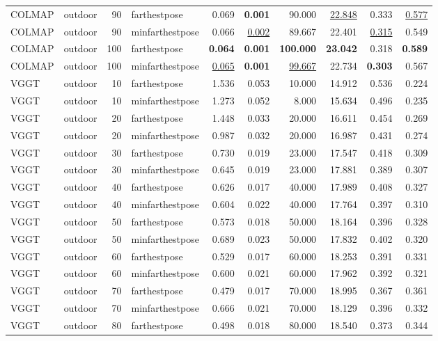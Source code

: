 \begin{table}[H]
\begin{tabular}{llrlrrrrrr}
COLMAP & outdoor & 90 & farthestpose & 0.069 & \textbf{0.001} & 90.000 & \underline{22.848} & 0.333 & \underline{0.577} \\
COLMAP & outdoor & 90 & minfarthestpose & 0.066 & \underline{0.002} & 89.667 & 22.401 & \underline{0.315} & 0.549 \\
COLMAP & outdoor & 100 & farthestpose & \textbf{0.064} & \textbf{0.001} & \textbf{100.000} & \textbf{23.042} & 0.318 & \textbf{0.589} \\
COLMAP & outdoor & 100 & minfarthestpose & \underline{0.065} & \textbf{0.001} & \underline{99.667} & 22.734 & \textbf{0.303} & 0.567 \\
VGGT & outdoor & 10 & farthestpose & 1.536 & 0.053 & 10.000 & 14.912 & 0.536 & 0.224 \\
VGGT & outdoor & 10 & minfarthestpose & 1.273 & 0.052 & 8.000 & 15.634 & 0.496 & 0.235 \\
VGGT & outdoor & 20 & farthestpose & 1.448 & 0.033 & 20.000 & 16.611 & 0.454 & 0.269 \\
VGGT & outdoor & 20 & minfarthestpose & 0.987 & 0.032 & 20.000 & 16.987 & 0.431 & 0.274 \\
VGGT & outdoor & 30 & farthestpose & 0.730 & 0.019 & 23.000 & 17.547 & 0.418 & 0.309 \\
VGGT & outdoor & 30 & minfarthestpose & 0.645 & 0.019 & 23.000 & 17.881 & 0.389 & 0.307 \\
VGGT & outdoor & 40 & farthestpose & 0.626 & 0.017 & 40.000 & 17.989 & 0.408 & 0.327 \\
VGGT & outdoor & 40 & minfarthestpose & 0.604 & 0.022 & 40.000 & 17.764 & 0.397 & 0.310 \\
VGGT & outdoor & 50 & farthestpose & 0.573 & 0.018 & 50.000 & 18.164 & 0.396 & 0.328 \\
VGGT & outdoor & 50 & minfarthestpose & 0.689 & 0.023 & 50.000 & 17.832 & 0.402 & 0.320 \\
VGGT & outdoor & 60 & farthestpose & 0.529 & 0.017 & 60.000 & 18.253 & 0.391 & 0.331 \\
VGGT & outdoor & 60 & minfarthestpose & 0.600 & 0.021 & 60.000 & 17.962 & 0.392 & 0.321 \\
VGGT & outdoor & 70 & farthestpose & 0.479 & 0.017 & 70.000 & 18.995 & 0.367 & 0.361 \\
VGGT & outdoor & 70 & minfarthestpose & 0.666 & 0.021 & 70.000 & 18.129 & 0.396 & 0.332 \\
VGGT & outdoor & 80 & farthestpose & 0.498 & 0.018 & 80.000 & 18.540 & 0.373 & 0.344 \\

\end{tabular}
\end{table}

